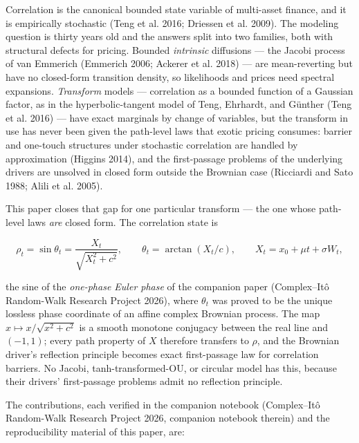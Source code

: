 \documentclass[
  english,
  10pt,
  letterpaper,
  DIV=11,
  numbers=noendperiod]{scrartcl}
\theoremstyle{plain}
\theoremstyle{plain}
\theoremstyle{plain}
\theoremstyle{plain}
\theoremstyle{definition}
\theoremstyle{remark}
\begin{document}
Correlation is the canonical bounded state variable of multi-asset
finance, and it is empirically stochastic (Teng et al. 2016; Driessen et
al. 2009). The modeling question is thirty years old and the answers
split into two families, both with structural defects for pricing.
Bounded \emph{intrinsic} diffusions --- the Jacobi process of van
Emmerich (Emmerich 2006; Ackerer et al. 2018) --- are mean-reverting but
have no closed-form transition density, so likelihoods and prices need
spectral expansions. \emph{Transform} models --- correlation as a
bounded function of a Gaussian factor, as in the hyperbolic-tangent
model of Teng, Ehrhardt, and Günther (Teng et al. 2016) --- have exact
marginals by change of variables, but the transform in use has never
been given the path-level laws that exotic pricing consumes: barrier and
one-touch structures under stochastic correlation are handled by
approximation (Higgins 2014), and the first-passage problems of the
underlying drivers are unsolved in closed form outside the Brownian case
(Ricciardi and Sato 1988; Alili et al. 2005).

This paper closes that gap for one particular transform --- the one
whose path-level laws \emph{are} closed form. The correlation state is

\[
\rho_t=\sin\theta_t=\frac{X_t}{\sqrt{X_t^{2}+c^{2}}},\qquad
\theta_t=\arctan(X_t/c),\qquad X_t=x_0+\mu t+\sigma W_t,
\]

the sine of the \emph{one-phase Euler phase} of the companion paper
(Complex--Itô Random-Walk Research Project 2026), where \(\theta_t\) was
proved to be the unique lossless phase coordinate of an affine complex
Brownian process. The map \(x\mapsto x/\sqrt{x^{2}+c^{2}}\) is a smooth
monotone conjugacy between the real line and \((-1,1)\); every path
property of \(X\) therefore transfers to \(\rho\), and the Brownian
driver's reflection principle becomes exact first-passage law for
correlation barriers. No Jacobi, tanh-transformed-OU, or circular model
has this, because their drivers' first-passage problems admit no
reflection principle.

The contributions, each verified in the companion notebook (Complex--Itô
Random-Walk Research Project 2026, companion notebook therein) and the
reproducibility material of this paper, are:
\end{document}
